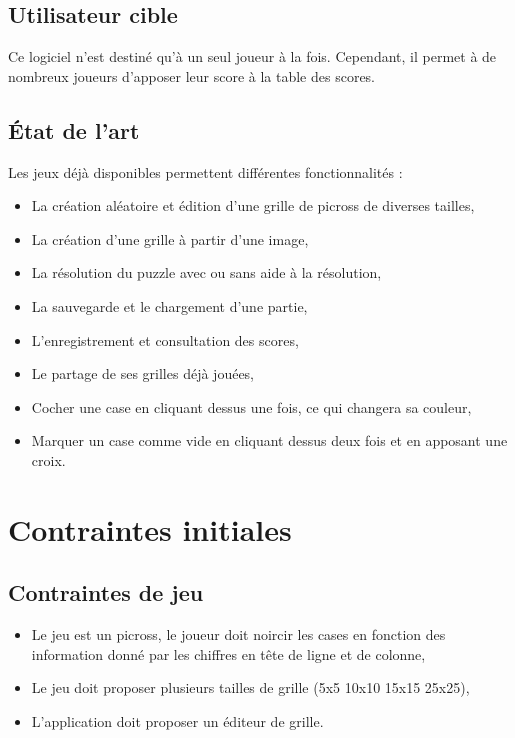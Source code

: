 \documentclass[11pt]{article}
\begin{document}
\subsection{Utilisateur cible}

Ce logiciel n'est destiné qu'à un seul joueur à la fois. Cependant, il permet à de nombreux joueurs d'apposer leur score à la table des scores.


\subsection{État de l'art}

Les jeux déjà disponibles permettent différentes fonctionnalités :
\begin{itemize}
   \item La création aléatoire et édition d'une grille de picross de diverses tailles,
   \item La création d'une grille à partir d'une image,
   \item La résolution du puzzle avec ou sans aide à la résolution,
   \item La sauvegarde et le chargement d'une partie,
   \item L'enregistrement et consultation des scores,
   \item Le partage de ses grilles déjà jouées,
   \item Cocher une case en cliquant dessus une fois, ce qui changera sa couleur,
   \item Marquer un case comme vide en cliquant dessus deux fois et en apposant une croix.
\end{itemize}




\section{Contraintes initiales}


\subsection{Contraintes de jeu}


\begin{itemize}
   \item Le jeu est un picross, le joueur doit noircir les cases en fonction des information donné par les chiffres en
       tête de ligne et de colonne,
   \item Le jeu doit proposer plusieurs tailles de grille (5x5 10x10 15x15 25x25),
   \item L'application doit proposer un éditeur de grille.
\end{itemize}
\end{document}
